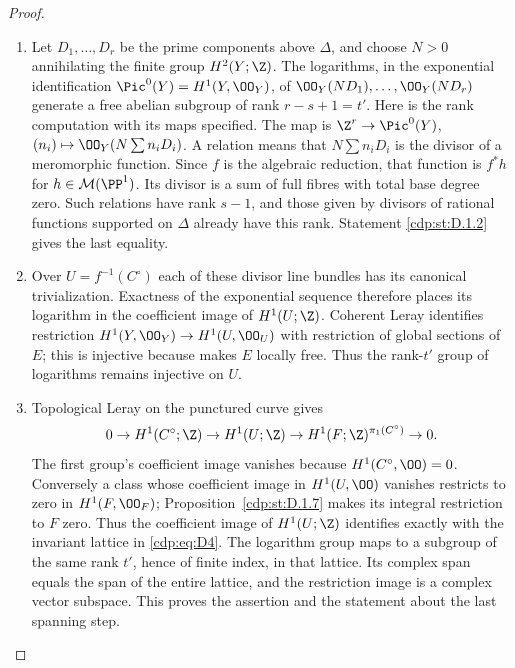 \begin{proof}

\begin{enumerate}[leftmargin=*]
\item Let $D_1,\ldots,D_r$ be the prime components above $\Delta$, and
choose $N>0$ annihilating the finite group $H^2(Y;\Z)$.
The logarithms, in the exponential identification
$\Pic^0(Y)=H^1(Y,\OO_Y)$, of
$\OO_Y(ND_1),\ldots,\OO_Y(ND_r)$ generate a free abelian
subgroup of rank $r-s+1=t'$.
Here is the rank computation with its maps specified. The map is
$\Z^r\to\Pic^0(Y)$, $(n_i)\mapsto\OO_Y(N\sum n_iD_i)$.
A relation means that $N\sum n_iD_i$ is the divisor of a
meromorphic function. Since $f$ is the algebraic reduction, that
function is $f^*h$ for $h\in\mathcal M(\PP^1)$.
Its divisor is a sum of full fibres with total base degree zero.
Such relations have rank $s-1$, and those given by divisors of
rational functions supported on $\Delta$ already have this rank.
Statement \ref{cdp:st:D.1.2} gives the last equality.

\item Over $U=f^{-1}(C^\circ)$ each of these divisor line bundles has
its canonical trivialization. Exactness of the exponential sequence
therefore places its logarithm in the coefficient image of
$H^1(U;\Z)$. Coherent Leray identifies restriction
$H^1(Y,\OO_Y)\to H^1(U,\OO_U)$ with restriction of global
sections of $E$; this is injective because \cite[Theorem~2.2, pp.~4--5]{Viaclovsky2026Combs} makes $E$ locally free.
Thus the rank-$t'$ group of logarithms remains injective on $U$.

\item Topological Leray on the punctured curve gives
\[
0\to H^1(C^\circ;\Z)\to H^1(U;\Z)
\to H^1(F;\Z)^{\pi_1(C^\circ)}\to0.
\]
The first group's coefficient image vanishes because
$H^1(C^\circ,\OO)=0$. Conversely a class whose coefficient image
in $H^1(U,\OO)$ vanishes restricts to zero in $H^1(F,\OO_F)$;
Proposition~\ref{cdp:st:D.1.7} makes its integral restriction to $F$ zero. Thus the
coefficient image of $H^1(U;\Z)$ identifies exactly with the
invariant lattice in \eqref{cdp:eq:D4}. The logarithm group maps to a subgroup
of the same rank $t'$, hence of finite index, in that lattice.
Its complex span equals the span of the entire lattice, and the
restriction image is a complex vector subspace. This proves the
assertion and the statement about the last spanning step.

\end{enumerate}
\end{proof}